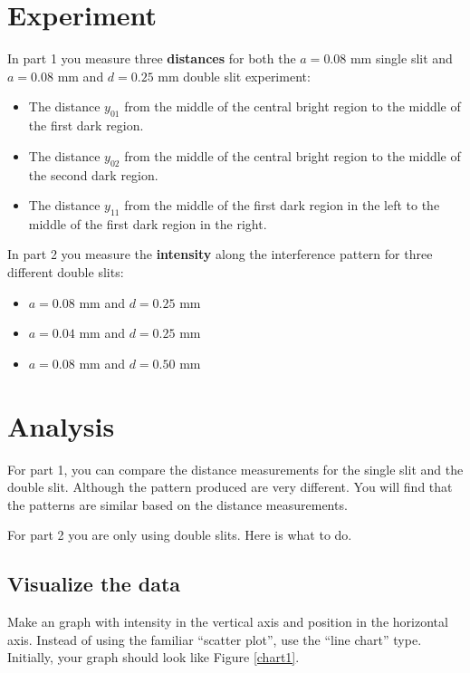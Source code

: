 \section{Experiment}
In part 1 you measure three \textbf{distances} for both the $a = 0.08$ mm single slit and $a = 0.08$ mm and $d = 0.25$ mm double slit experiment:
\begin{itemize}
	\item The distance $y_{01}$ from the middle of the central bright region to the middle of the first dark region.
	\item The distance $y_{02}$ from the middle of the central bright region to the middle of the second dark region.
	\item The distance $y_{11}$ from the middle of the first dark region in the left to the middle of the first dark region in the right.
\end{itemize}
In part 2 you measure the \textbf{intensity} along the interference pattern for three different double slits:
\begin{itemize}
	\item $a = 0.08$ mm and $d = 0.25$ mm
	\item $a = 0.04$ mm and $d = 0.25$ mm
	\item $a = 0.08$ mm and $d = 0.50$ mm
\end{itemize}
\section{Analysis}
For part 1, you can compare the distance measurements for the single slit and the double slit. Although the pattern produced are very different. You will find that the patterns are similar based on the distance measurements.

For part 2 you are only using double slits. Here is what to do.
\subsection{Visualize the data}
Make an graph with intensity in the vertical axis and position in the horizontal axis. Instead of using the familiar ``scatter plot'', use the ``line chart'' type. Initially, your graph should look like Figure \ref{chart1}.
